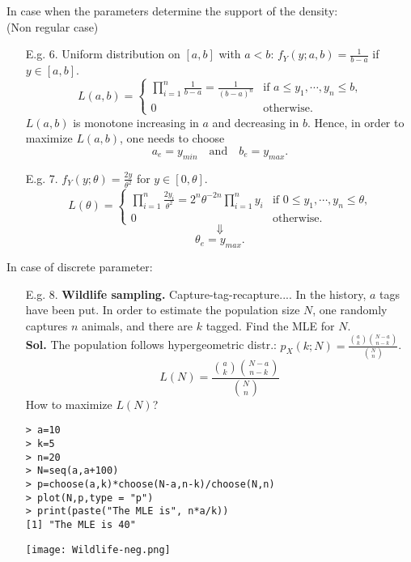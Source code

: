 \begin{frame}
In case when the parameters determine the support of the density:\\
(Non regular case)
\vfill

 \begin{enumerate}
 \item[E.g. 6.] Uniform distribution on $[a,b]$ with $a<b$: $f_Y(y;a,b)=\frac{1}{b-a}$ if $y\in [a,b]$.
 \[
 L(a,b) =
 \begin{cases}
  \prod_{i=1}^n \frac{1}{b-a} =\frac{1}{(b-a)^n}  & \text{if $a\le y_1,\cdots,y_n\le b$,}\\
  0  & \text{otherwise.}
 \end{cases}
 \]\pause
 $L(a,b)$ is monotone increasing in $a$ and decreasing in $b$. Hence, in order to maximize $L(a,b)$,
 one needs to choose
 \[
  a_e=y_{min} \quad\text{and}\quad b_e=y_{max}.
 \]\pause
 \vfill
  \item[E.g. 7.] $f_Y(y;\theta) = \frac{2y}{\theta^2}$ for $y\in [0,\theta]$.
  \[
 L(\theta) =
 \begin{cases}
  \prod_{i=1}^n \frac{2y_i}{\theta^2} =2^n \theta^{-2n}\prod_{i=1}^n y_i  & \text{if $0\le y_1,\cdots,y_n\le \theta$,}\\
  0  & \text{otherwise.}
 \end{cases}
  \]\pause
  \[
  \Downarrow
  \]
  \[
  \theta_e = y_{max}.
  \]
  \end{enumerate}
\end{frame}
\begin{frame}[fragile]
In case of discrete parameter:
\vfill
\begin{enumerate}
 \item[E.g. 8.] {\bf Wildlife sampling.}  Capture-tag-recapture.... In the history, $a$ tags have been put.
 In order to estimate the population size $N$, one randomly captures $n$ animals, and there are $k$ tagged. Find the MLE for $N$.\\
 \vfill
 {\bf Sol.}
 The population follows hypergeometric distr.: $p_X(k;N)=\frac{{a\choose k}{N-a\choose n-k}}{{N\choose n}}$.\\ \pause
 \[
 L(N) = \frac{{a\choose k}{N-a\choose n-k}}{{N\choose n}}
 \]\pause
 How to maximize $L(N)$? \\ \pause
 \begin{minipage}{0.4\textwidth}
 \begin{lstlisting}
> a=10
> k=5
> n=20
> N=seq(a,a+100)
> p=choose(a,k)*choose(N-a,n-k)/choose(N,n)
> plot(N,p,type = "p")
> print(paste("The MLE is", n*a/k))
[1] "The MLE is 40"
 \end{lstlisting}
 \end{minipage}
 \quad
 \begin{minipage}{ 0.45\textwidth}
	 \texttt{[image: Wildlife-neg.png]}
 \end{minipage}
\end{enumerate}
\end{frame}
